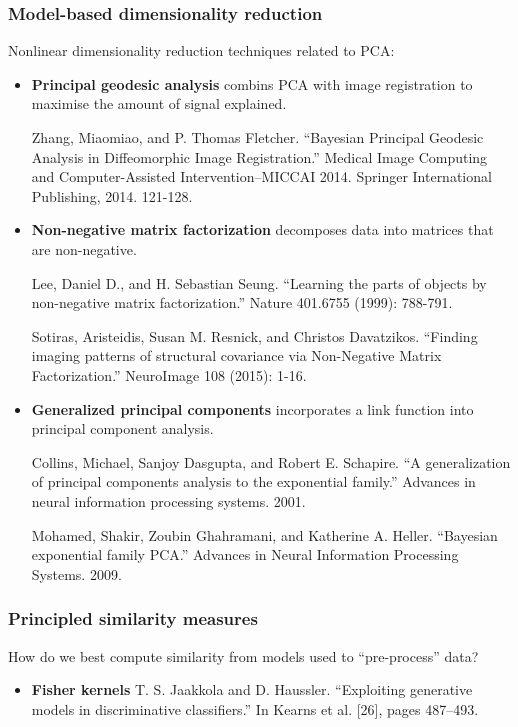 \begin{frame}
\frametitle{Model-based dimensionality reduction}
Nonlinear dimensionality reduction techniques related to PCA:
\begin{itemize}
\item {\bf Principal geodesic analysis} combins PCA with image registration to maximise the amount of signal explained.\par
\begin{tiny}
Zhang, Miaomiao, and P. Thomas Fletcher. ``Bayesian Principal Geodesic Analysis in Diffeomorphic Image Registration.'' Medical Image Computing and Computer-Assisted Intervention--MICCAI 2014. Springer International Publishing, 2014. 121-128.\par
\end{tiny}
\item {\bf Non-negative matrix factorization} decomposes data into matrices that are non-negative.\par
\begin{tiny}
Lee, Daniel D., and H. Sebastian Seung. ``Learning the parts of objects by non-negative matrix factorization.'' Nature 401.6755 (1999): 788-791.\par
Sotiras, Aristeidis, Susan M. Resnick, and Christos Davatzikos. ``Finding imaging patterns of structural covariance via Non-Negative Matrix Factorization.'' NeuroImage 108 (2015): 1-16.\par
\end{tiny}
\item {\bf Generalized principal components} incorporates a link function into principal component analysis.\par
\begin{tiny}
Collins, Michael, Sanjoy Dasgupta, and Robert E. Schapire. ``A generalization of principal components analysis to the exponential family.'' Advances in neural information processing systems. 2001.\par
Mohamed, Shakir, Zoubin Ghahramani, and Katherine A. Heller. ``Bayesian exponential family PCA.'' Advances in Neural Information Processing Systems. 2009.\par
\end{tiny}
\end{itemize}
\end{frame}

\begin{frame}
\frametitle{Principled similarity measures}
How do we best compute similarity from models used to ``pre-process'' data?
\begin{itemize}
\item {\bf Fisher kernels} T. S. Jaakkola and D. Haussler. ``Exploiting generative models in discriminative classifiers.'' In Kearns et al. [26], pages 487--493.
\end{itemize}
\end{frame}

